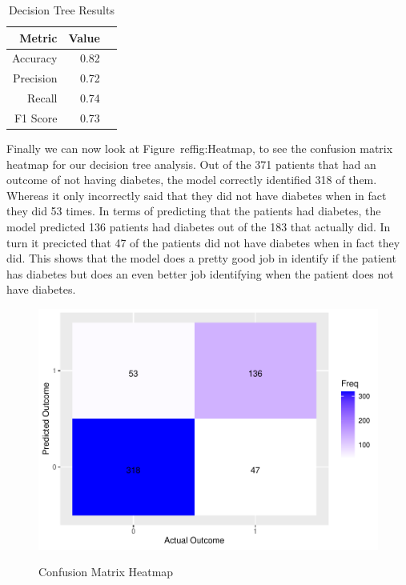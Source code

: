 \documentclass[12pt]{article}
\begin{document}
\begin{table}[ht]
  \centering
  \caption{Decision Tree Results}
  \label{tab:dtr} 
  \begin{tabular}{rrr}
    \toprule
    Metric & Value\\
    \midrule
    Accuracy & 0.82\\
    Precision & 0.72\\
    Recall & 0.74\\
    F1 Score & 0.73\\
    \bottomrule
  \end{tabular}
\end{table}

Finally we can now look at Figure~ref{fig:Heatmap}, to see the confusion matrix heatmap for our decision tree analysis. Out of the 371 patients that had an outcome
of not having diabetes, the model correctly identified 318 of them. Whereas it only incorrectly said that they did not have diabetes when in fact they did 53 times. 
In terms of predicting that the patients had diabetes, the model predicted 136 patients had diabetes out of the 183 that actually did. In turn it precicted that 47 of the
patients did not have diabetes when in fact they did. This shows that the model does a pretty good job in identify if the patient has diabetes but does an even better job
identifying when the patient does not have diabetes.  

\begin{figure}[tbp]
  \centering
  \caption{Confusion Matrix Heatmap}
  \includegraphics[width=\textwidth]{Confusion Matrix Heatmap.pdf}
  \label{fig:Heatmap}
\end{figure}
\end{document}
